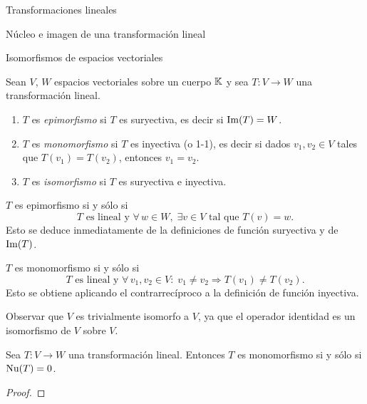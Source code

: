 \begin{chapter}{Transformaciones lineales}
\begin{section}{N\'ucleo e imagen de una transformaci\'on lineal}
        \end{section}
    
        \begin{section}{Isomorfismos de espacios vectoriales}\label{seccion-isomorfismos-de-ev}
        
        \begin{definicion}
            Sean $V$, $W$ espacios vectoriales sobre un cuerpo $\mathbb K$ y sea $T:V \to W$ una transformación lineal.
            \begin{enumerate}
                \item $T$  es \textit{epimorfismo} si $T$ es suryectiva, es decir si $\operatorname{Im}(T) = W$.
                \item $T$ es \textit{monomorfismo} si $T$ es inyectiva (o 1-1),  es decir si dados $v_1,v_2 \in V$ tales que $T(v_1) = T(v_2)$,  entonces $v_1 = v_2$.
                \item $T$ es \textit{isomorfismo} si $T$ es suryectiva e inyectiva.
            \end{enumerate}  
        \end{definicion}
    
        \begin{observacion*}
            $T$  es epimorfismo si y sólo si 
            $$
            \text{$T$ es lineal y }\forall\, w \in W, \; \exists v \in V \text{ tal que }T(v)=w.
            $$
            Esto se deduce inmediatamente de la definiciones de función suryectiva y de $\operatorname{Im}(T)$.
            
            $T$ es monomorfismo si y sólo si 
            $$
                \text{$T$ es lineal y }\forall\, v_1,v_2  \in V: \; v_1 \ne v_2 \Rightarrow T(v_1) \not= T(v_2).
            $$ 
            Esto se obtiene aplicando el contrarrecíproco a la definición de función inyectiva.
        \end{observacion*}	
        
        Observar que $V$ es trivialmente isomorfo a $V$, ya que el operador identidad es un isomorfismo de $V$ sobre $V$. 
            
        \begin{proposicion}\label{inyectiva-sii-nuT=0}
            Sea $T:V \to W$ una transformación lineal. Entonces $T$ es monomorfismo si y sólo si $\operatorname{Nu}(T) =0$.
        \end{proposicion}	
        \begin{proof} 
            

\end{proof}
\end{section}
\end{chapter}
